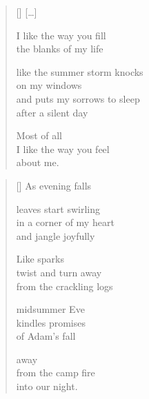 \documentclass[14pt]{extbook}
\newcommand*{\centeredornament}{\centerline{\pgfornament[width=6cm]{88}}}
\begin{document}
\newpage

\vspace*{-15mm}
\centeredornament
\vspace*{-7mm}

\poemtitle*{\phantom{XXIX}}

\settowidth{\versewidth}{like the summer storm knocks}

\begin{verse}[\versewidth]
  \textnormal{[\ldots]}

  I like the way you fill \\
  the blanks of my life

  like the summer storm knocks \\
  on my windows \\
  and puts my sorrows to sleep \\
  after a silent day

  Most of all \\
  I like the way you feel \\
  about me.
\end{verse}


\newpage

\vspace*{-15mm}
\centeredornament
\vspace*{-7mm}


\settowidth{\versewidth}{in a corner of my heart}

\begin{verse}[\versewidth]
  As evening falls

  leaves start swirling \\
  in a corner of my heart \\
  and jangle joyfully

  Like sparks \\
  twist and turn away \\
  from the crackling logs

  midsummer Eve \\
  kindles promises \\
  of Adam's fall

  away \\
  from the camp fire \\
  into our night.
\end{verse}

\end{document}
